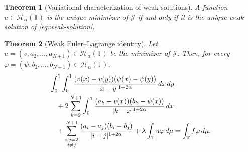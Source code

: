 \documentclass[10pt,a4paper]{amsart}
\newtheorem{theorem}{Theorem}
\newcommand{\HH}{\mathcal{H}}
\newcommand{\JJ}{\mathcal{J}}
\newcommand{\T}{\mathbb{T}}
\newcommand{\abs}[1]{\lvert#1\rvert}
\newcommand{\ddmu}{\,d\mu}
\begin{document}
\begin{theorem}[Variational characterization of weak solutions]\label{thm:weak-var-equivalence}
A function $u\in\HH_\alpha(\T)$ is the unique minimizer of $\JJ$ if and only if it is the unique weak solution of \eqref{eq:weak-solution}.
\end{theorem}

\begin{theorem}[Weak Euler--Lagrange identity]\label{thm:weak-EL}
Let $u=(v,a_2,\dots,a_{N+1})\in\HH_\alpha(\T)$ be the minimizer of $\JJ$. Then, for every $\varphi=(\psi,b_2,\dots,b_{N+1})\in\HH_\alpha(\T)$,
\begin{align}\label{eq:split-weak-form}
&\int_0^1\int_0^1
\frac{(v(x)-v(y))(\psi(x)-\psi(y))}{\abs{x-y}^{1+2\alpha}}\,dx\,dy \notag\\
&\quad +2\sum_{k=2}^{N+1}\int_0^1
\frac{(a_k-v(x))(b_k-\psi(x))}{\abs{k-x}^{1+2\alpha}}\,dx \\
&\quad +\sum_{\substack{i,j=2\\ i\neq j}}^{N+1}
\frac{(a_i-a_j)(b_i-b_j)}{\abs{i-j}^{1+2\alpha}}
+\lambda\int_{\T}u\varphi\ddmu
=\int_{\T}f\varphi\ddmu.\notag
\end{align}
\end{theorem}
\end{document}
